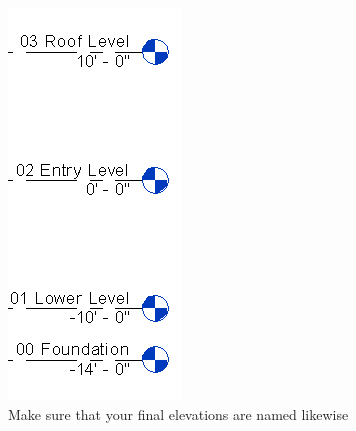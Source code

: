 \documentclass{tufte-book} %
\begin{document}
\begin{figure}
\begin{enumerate}
	\begin{marginfigure}
		\includegraphics[width=\linewidth]{revitelevationsname.png}
		\caption[The names of elevation lines]{Make sure that your final elevations are named likewise}
		\label{fig:revelevname}
	\end{marginfigure}
	

\end{enumerate}
\end{figure}
\end{document}
